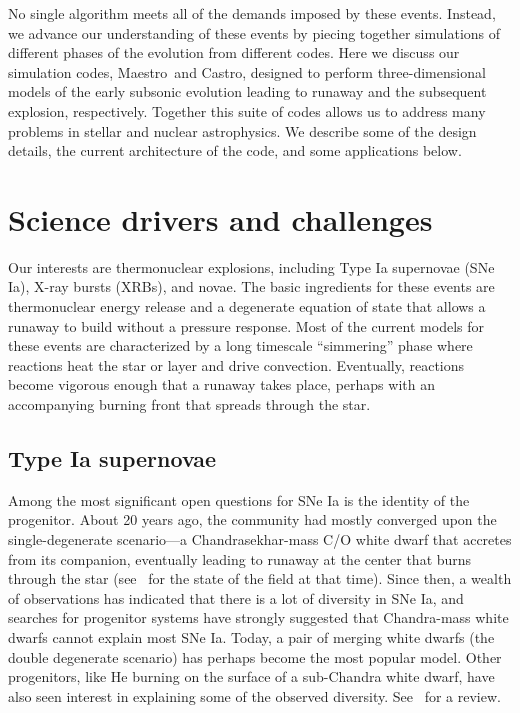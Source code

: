 \documentclass[a4paper]{jpconf}
\newcommand{\maestro}{{\sffamily Maestro}}
\newcommand{\castro}{{\sffamily Castro}}
\begin{document}
No single algorithm meets all of the demands imposed by these events.
Instead, we advance our understanding of these events by piecing
together simulations of different phases of the evolution from
different codes.  Here we discuss our simulation codes, \maestro\ and
\castro, designed to perform three-dimensional models of the early
subsonic evolution leading to runaway and the subsequent explosion,
respectively.  Together this suite of codes allows us to address many
problems in stellar and nuclear astrophysics.  We describe some of the
design details, the current architecture of the code, and some
applications below.

\section{Science drivers and challenges}

Our interests are thermonuclear explosions, including Type Ia
supernovae (SNe Ia), X-ray bursts (XRBs), and novae.  The basic
ingredients for these events are thermonuclear energy release and a
degenerate equation of state that allows a runaway to build without a
pressure response.  Most of the current models for these events are
characterized by a long timescale ``simmering'' phase where reactions
heat the star or layer and drive convection.  Eventually, reactions
become vigorous enough that a runaway takes place, perhaps with an
accompanying burning front that spreads through the star.

\subsection{Type Ia supernovae}

Among the most significant open questions for SNe Ia is the identity of the
progenitor.  About 20 years ago, the community had
mostly converged upon the single-degenerate scenario---a
Chandrasekhar-mass C/O white dwarf that accretes from its companion,
eventually leading to runaway at the center that burns through the
star (see~\cite{hillebrandtniemeyer2000} for the state of the field at
that time).  Since then, a wealth of observations has indicated that
there is a lot of diversity in SNe Ia, and searches for progenitor
systems have strongly suggested that Chandra-mass white dwarfs cannot
explain most SNe Ia.  Today, a pair of merging white dwarfs (the double
degenerate scenario) has perhaps become the most popular model.
Other progenitors, like He burning on the surface of a sub-Chandra
white dwarf, have also seen interest in explaining some of the observed
diversity.  See~\cite{araa-maoz} for a review.
\end{document}
